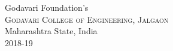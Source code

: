 \begin{titlepage}




 


\vfill %

\normalsize Godavari Foundation's\\[0.5cm]
\textsc{\normalsize Godavari College of Engineering, Jalgaon}\\[0.5cm]
\normalsize Maharashtra State, India\\[0.5cm]
\normalsize 2018-19\\[0.5cm]
\end{titlepage}
 